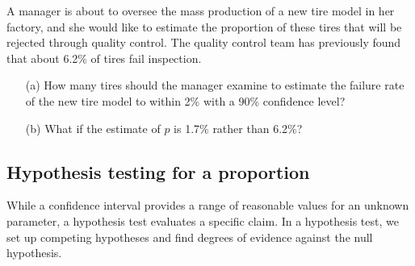 \begin{exercisewrap}
\begin{nexercise}
A manager is about to oversee the mass production of a new tire model in her factory, and she would like to estimate the proportion of these tires that will be rejected through quality control. The quality control team has previously found that about 6.2\% of tires fail inspection.
\begin{itemize}
\setlength{\itemsep}{0mm}
\item[(a)] How many tires should the manager examine to estimate the failure rate of the new tire model to within 2\% with a 90\% confidence level?\footnotemark
\item[(b)] What if the estimate of $p$ is 1.7\% rather than 6.2\%?\footnotemark
 
\end{itemize}
\end{nexercise}
\end{exercisewrap}



\D{\newpage}

\subsection{Hypothesis testing for a proportion}
\label{htForPropSection}

While a confidence interval provides a range of reasonable values for an unknown parameter, a hypothesis test evaluates a specific claim. In a hypothesis test, we set up competing hypotheses and find degrees of evidence against the null hypothesis.

